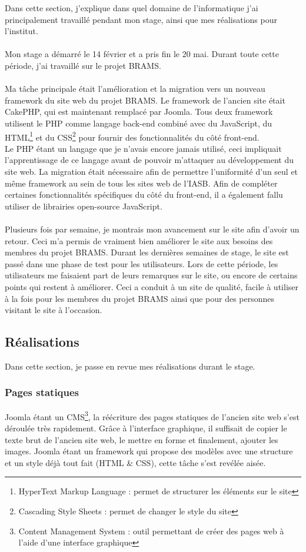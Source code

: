 \documentclass[11pt]{article}
\begin{document}
Dans cette section, j'explique dans quel domaine de l'informatique j'ai principalement travaillé pendant mon stage, ainsi que mes réalisations pour l'institut.\\
\\
Mon stage a démarré le 14 février et a pris fin le 20 mai. Durant toute cette période, j'ai travaillé sur le projet BRAMS.\\
\\
Ma tâche principale était l'amélioration et la migration vers un nouveau framework du site web du projet BRAMS.
Le framework de l'ancien site était CakePHP, qui est maintenant remplacé par Joomla.
Tous deux framework utilisent le PHP comme langage back-end combiné avec du JavaScript, du HTML\footnote{HyperText Markup Language : permet de structurer les éléments sur le site} et du CSS\footnote{Cascading Style Sheets : permet de changer le style du site} pour fournir des fonctionnalités du côté front-end.\\
Le PHP étant un langage que je n'avais encore jamais utilisé, ceci impliquait l'apprentissage de ce langage avant de pouvoir m'attaquer au développement du site web.
La migration était nécessaire afin de permettre l'uniformité d'un seul et même framework au sein de tous les sites web de l'IASB.
Afin de compléter certaines fonctionnalités spécifiques du côté du front-end, il a également fallu utiliser de librairies open-source JavaScript.\\
\\
Plusieurs fois par semaine, je montrais mon avancement sur le site afin d'avoir un retour.
Ceci m'a permis de vraiment bien améliorer le site aux besoins des membres du projet BRAMS.
Durant les dernières semaines de stage, le site est passé dans une phase de test pour les utilisateurs.
Lors de cette période, les utilisateurs me faisaient part de leurs remarques sur le site, ou encore de certains points qui restent à améliorer.
Ceci a conduit à un site de qualité, facile à utiliser à la fois pour les membres du projet BRAMS ainsi que pour des personnes visitant le site à l'occasion.

\subsection{Réalisations}

Dans cette section, je passe en revue mes réalisations durant le stage.

\subsubsection{Pages statiques}
Joomla étant un CMS\footnote{Content Management System : outil permettant de créer des pages web à l'aide d'une interface graphique}, la réécriture des pages statiques de l'ancien site web s'est déroulée très rapidement.
Grâce à l'interface graphique, il suffisait de copier le texte brut de l'ancien site web, le mettre en forme et finalement, ajouter les images.
Joomla étant un framework qui propose des modèles avec une structure et un style déjà tout fait (HTML \& CSS), cette tâche s'est revélée aisée.
\end{document}
